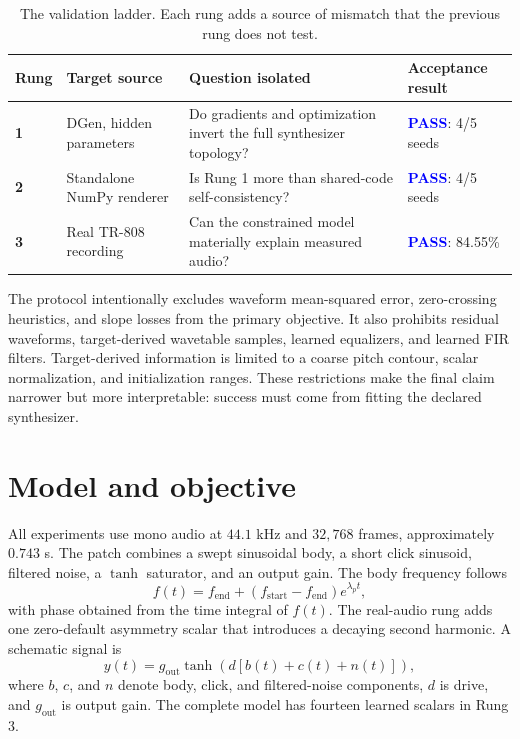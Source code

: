 \documentclass[10pt]{article}
\newcommand{\pass}{\textcolor{blue}{\textbf{PASS}}}
\begin{document}
\begin{table}[H]
\centering
\small
\begin{tabularx}{\linewidth}{@{}>{\bfseries}p{0.55in}p{1.55in}X p{1.15in}@{}}
\toprule
Rung & Target source & Question isolated & Acceptance result \\
\midrule
1 & DGen, hidden parameters & Do gradients and optimization invert the full synthesizer topology? & \pass: 4/5 seeds \\
2 & Standalone NumPy renderer & Is Rung 1 more than shared-code self-consistency? & \pass: 4/5 seeds \\
3 & Real TR-808 recording & Can the constrained model materially explain measured audio? & \pass: 84.55\% \\
\bottomrule
\end{tabularx}
\caption{The validation ladder. Each rung adds a source of mismatch that the previous rung does not test.}
\label{tab:ladder}
\end{table}

The protocol intentionally excludes waveform mean-squared error, zero-crossing heuristics, and slope losses from the primary objective. It also prohibits residual waveforms, target-derived wavetable samples, learned equalizers, and learned FIR filters. Target-derived information is limited to a coarse pitch contour, scalar normalization, and initialization ranges. These restrictions make the final claim narrower but more interpretable: success must come from fitting the declared synthesizer.

\section{Model and objective}

All experiments use mono audio at $44.1$ kHz and $32{,}768$ frames, approximately $0.743$ s. The patch combines a swept sinusoidal body, a short click sinusoid, filtered noise, a $\tanh$ saturator, and an output gain. The body frequency follows
\begin{equation}
f(t)=f_{\mathrm{end}} + \left(f_{\mathrm{start}}-f_{\mathrm{end}}\right)e^{\lambda_p t},
\end{equation}
with phase obtained from the time integral of $f(t)$. The real-audio rung adds one zero-default asymmetry scalar that introduces a decaying second harmonic. A schematic signal is
\begin{equation}
y(t)=g_{\mathrm{out}}\tanh\!\left(d\left[b(t)+c(t)+n(t)\right]\right),
\end{equation}
where $b$, $c$, and $n$ denote body, click, and filtered-noise components, $d$ is drive, and $g_{\mathrm{out}}$ is output gain. The complete model has fourteen learned scalars in Rung 3.
\end{document}
